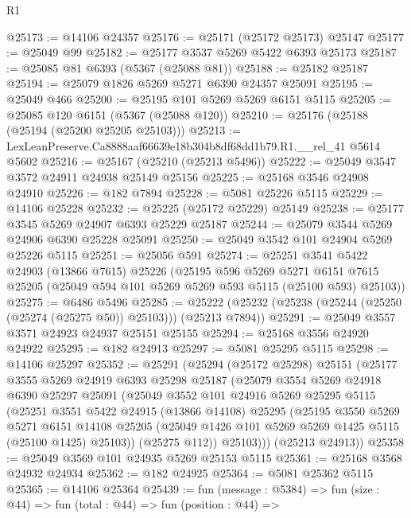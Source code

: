 \begin{lexlean}{R1}
\begin{coremodule}
@25173 := @14106 @24357
@25176 := @25171 (@25172 @25173) @25147
@25177 := @25049 @99
@25182 := @25177 @3537 @5269 @5422 @6393 @25173
@25187 := @25085 @81 @6393 (@5367 (@25088 @81))
@25188 := @25182 @25187
@25194 := @25079 @1826 @5269 @5271 @6390 @24357 @25091
@25195 := @25049 @466
@25200 := @25195 @101 @5269 @5269 @6151 @5115
@25205 := @25085 @120 @6151 (@5367 (@25088 @120))
@25210 := @25176 (@25188 (@25194 (@25200 @25205 @25103)))
@25213 := LexLeanPreserve.Ca8888aaf66639e18b304b8df68dd1b79.R1.__rel_41 @5614 @5602
@25216 := @25167 (@25210 (@25213 @5496))
@25222 := @25049 @3547 @3572 @24911 @24938 @25149 @25156
@25225 := @25168 @3546 @24908 @24910
@25226 := @182 @7894
@25228 := @5081 @25226 @5115
@25229 := @14106 @25228
@25232 := @25225 (@25172 @25229) @25149
@25238 := @25177 @3545 @5269 @24907 @6393 @25229 @25187
@25244 := @25079 @3544 @5269 @24906 @6390 @25228 @25091
@25250 := @25049 @3542 @101 @24904 @5269 @25226 @5115
@25251 := @25056 @591
@25274 := @25251
    @3541
    @5422
    @24903
    (@13866 @7615)
    @25226
    (@25195
      @596
      @5269
      @5271
      @6151
      @7615
      @25205
      (@25049 @594 @101 @5269 @5269 @593 @5115 (@25100 @593) @25103))
@25275 := @6486 @5496
@25285 := @25222 (@25232 (@25238 (@25244 (@25250 (@25274 (@25275 @50)) @25103))) (@25213 @7894))
@25291 := @25049 @3557 @3571 @24923 @24937 @25151 @25155
@25294 := @25168 @3556 @24920 @24922
@25295 := @182 @24913
@25297 := @5081 @25295 @5115
@25298 := @14106 @25297
@25352 := @25291
    (@25294
      (@25172 @25298)
      @25151
      (@25177
        @3555
        @5269
        @24919
        @6393
        @25298
        @25187
        (@25079
          @3554
          @5269
          @24918
          @6390
          @25297
          @25091
          (@25049
            @3552
            @101
            @24916
            @5269
            @25295
            @5115
            (@25251
              @3551
              @5422
              @24915
              (@13866 @14108)
              @25295
              (@25195
                @3550
                @5269
                @5271
                @6151
                @14108
                @25205
                (@25049 @1426 @101 @5269 @5269 @1425 @5115 (@25100 @1425) @25103))
              (@25275 @112))
            @25103)))
      (@25213 @24913))
@25358 := @25049 @3569 @101 @24935 @5269 @25153 @5115
@25361 := @25168 @3568 @24932 @24934
@25362 := @182 @24925
@25364 := @5081 @25362 @5115
@25365 := @14106 @25364
@25439 := fun (message : @5384) =>
  fun (size : @44) =>
  fun (total : @44) =>
  fun (position : @44) =>

\end{coremodule}
\end{lexlean}
